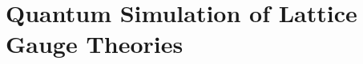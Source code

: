 \chapter{Quantum Simulation of Lattice Gauge Theories}
\label{chap:quantum_simulation_of_lattice_gauge_theories}









